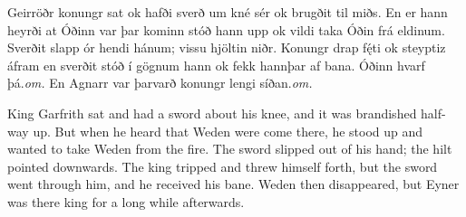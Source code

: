 Geirröðr konungr sat ok hafði sverð um kné sér ok brugðit til miðs. En er hann heyrði at Óðinn var þar kominn stóð hann upp ok vildi taka Óðin frá eldinum. Sverðit slapp ór hendi hánum; vissu hjöltin niðr. Konungr drap fę́ti ok steyptiz áfram en sverðit stóð í gögnum hann ok fekk {hann}{þar af \AM} bana. {Óðinn hvarf þá.}{\emph{om.} \AM} En Agnarr {var þar}{varð \AM} konungr {lengi síðan.}{\emph{om.} \AM}

King Garfrith sat and had a sword about his knee, and it was brandished half-way up. But when he heard that Weden were come there, he stood up and wanted to take Weden from the fire. The sword slipped out of his hand; the hilt pointed downwards. The king tripped and threw himself forth, but the sword went through him, and he received his bane. Weden then disappeared, but Eyner was there king for a long while afterwards.
